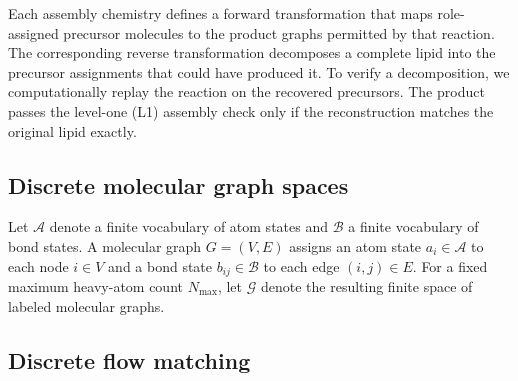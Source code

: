 \documentclass{article}
\begin{document}
Each assembly chemistry defines a forward transformation that maps role-assigned precursor
molecules to the product graphs permitted by that reaction.
The corresponding reverse transformation decomposes a complete lipid into the precursor
assignments that could have produced it.
To verify a decomposition, we computationally replay the reaction on the recovered precursors.
The product passes the level-one (L1) assembly check only if the reconstruction matches the original
lipid exactly.

\subsection{Discrete molecular graph spaces}

Let $\mathcal{A}$ denote a finite vocabulary of atom states and $\mathcal{B}$ a finite vocabulary of
bond states.
A molecular graph $G=(V,E)$ assigns an atom state $a_i\in\mathcal{A}$ to each node $i\in V$ and a
bond state $b_{ij}\in\mathcal{B}$ to each edge $(i,j)\in E$.
For a fixed maximum heavy-atom count $N_{\max}$, let $\mathcal{G}$ denote the resulting finite space
of labeled molecular graphs.

\subsection{Discrete flow matching}
\end{document}
